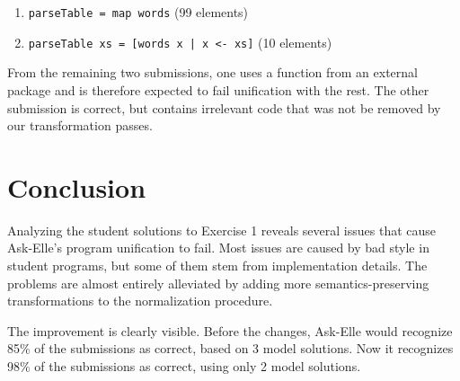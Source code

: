 \begin{enumerate}
    \item \texttt{parseTable = map words} (99 elements)
    \item \texttt{parseTable xs = [words x | x <- xs]} (10 elements)
\end{enumerate}

From the remaining two submissions, one uses a function from an external package and is therefore expected to fail unification with the rest. The other submission is correct, but contains irrelevant code that was not be removed by our transformation passes.



\section{Conclusion}

Analyzing the student solutions to Exercise 1 reveals several issues that cause Ask-Elle's program unification to fail. Most issues are caused by bad style in student programs, but some of them stem from implementation details. The problems are almost entirely alleviated by adding more semantics-preserving transformations to the normalization procedure.

The improvement is clearly visible. Before the changes, Ask-Elle would recognize 85\% of the submissions as correct, based on 3 model solutions. Now it recognizes 98\% of the submissions as correct, using only 2 model solutions.


